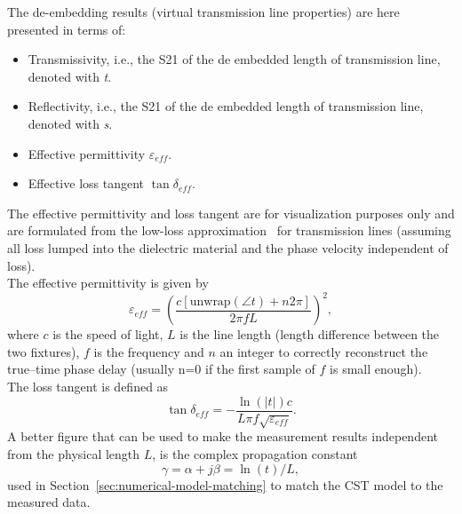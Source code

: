 \documentclass[11pt,a4paper]{article}
\newcommand{\sref}[1]{Section~\ref{#1}}
\begin{document}


    The de-embedding results (virtual transmission line properties) are here presented in terms of:
    \begin{itemize}
        \item Transmissivity, i.e., the S21 of the de embedded length of transmission line, denoted with \emph{t}.
        \item Reflectivity, i.e., the S21 of the de embedded length of transmission line, denoted with \emph{s}.
        \item Effective permittivity $\varepsilon_{eff}$.
        \item Effective loss tangent $\tan\delta_{eff}$.
    \end{itemize}
    The effective permittivity and loss tangent are for visualization purposes only and are formulated from the low-loss
    approximation~\cite{Pozar} for transmission lines (assuming all loss lumped into the dielectric material and
    the phase velocity independent of loss).\\
    The effective permittivity is given by
    \begin{equation}
        \varepsilon_{eff} = \left(\dfrac{ c [\text{unwrap}(\angle{t}) + n2\pi]} {2\pi f L}\right)^2,
        \label{eq:epsilon}
    \end{equation}
    where $c$ is the speed of light, $L$ is the line length (length difference between the two fixtures),
    $f$ is the frequency and $n$ an integer to correctly reconstruct the true--time phase delay
    (usually n=0 if the first sample of $f$ is small enough).\\
    The loss tangent is defined as
    \begin{equation}
        \tan \delta_{eff} = -\dfrac{\ln(|t|) c}{L \pi f \sqrt{\varepsilon_{eff}}}.
        \label{eq:tand}
    \end{equation}
    A better figure that can be used to make the measurement results independent from the physical length $L$, is the
    complex propagation constant
    \begin{equation}
        \gamma = \alpha + j \beta = \ln(t) / L,
        \label{eq:gamma}
    \end{equation}
    used in \sref{sec:numerical-model-matching} to match the CST model to the measured data.\\
\end{document}
